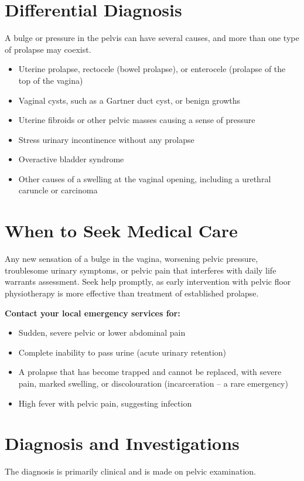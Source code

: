 \section*{Differential Diagnosis}
A bulge or pressure in the pelvis can have several causes, and more than one type of prolapse may coexist.

\begin{itemize}
    \item Uterine prolapse, rectocele (bowel prolapse), or enterocele (prolapse of the top of the vagina)
    \item Vaginal cysts, such as a Gartner duct cyst, or benign growths
    \item Uterine fibroids or other pelvic masses causing a sense of pressure
    \item Stress urinary incontinence without any prolapse
    \item Overactive bladder syndrome
    \item Other causes of a swelling at the vaginal opening, including a urethral caruncle or carcinoma
\end{itemize}

\section*{When to Seek Medical Care}
Any new sensation of a bulge in the vagina, worsening pelvic pressure, troublesome urinary symptoms, or pelvic pain that interferes with daily life warrants assessment. Seek help promptly, as early intervention with pelvic floor physiotherapy is more effective than treatment of established prolapse.

\textbf{Contact your local emergency services for:}
\begin{itemize}
    \item Sudden, severe pelvic or lower abdominal pain
    \item Complete inability to pass urine (acute urinary retention)
    \item A prolapse that has become trapped and cannot be replaced, with severe pain, marked swelling, or discolouration (incarceration -- a rare emergency)
    \item High fever with pelvic pain, suggesting infection
\end{itemize}

\section*{Diagnosis and Investigations}
The diagnosis is primarily clinical and is made on pelvic examination.

